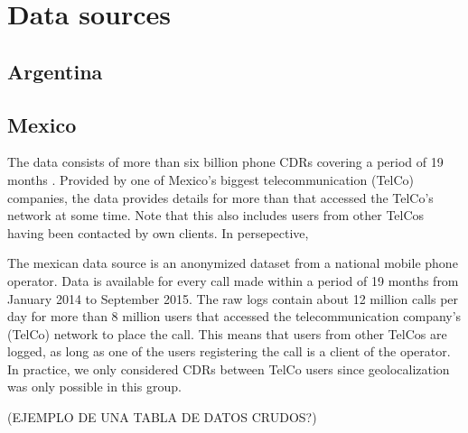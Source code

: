 \section{Data sources}
\subsection{Argentina}

\subsection{Mexico}

The data consists of more than six billion phone CDRs covering a period of 19 months . Provided by one of Mexico's biggest telecommunication (TelCo) companies, the data provides details for more than  that accessed the TelCo's network at some time. Note that this also includes users from other TelCos having been contacted by own clients. In persepective, 

The mexican data source is an anonymized dataset from a national mobile phone operator. Data is available for every call made within a period of 19 months from January 2014 to September 2015. The raw logs contain about 12 million calls per day for more than 8 million users that accessed the telecommunication company's (TelCo) network to place the call. This means that users from other TelCos are logged, as long as one of the users registering the call is a client of the operator. In practice, we only considered CDRs between TelCo users since geolocalization was only possible in this group.

(EJEMPLO DE UNA TABLA DE DATOS CRUDOS?)


